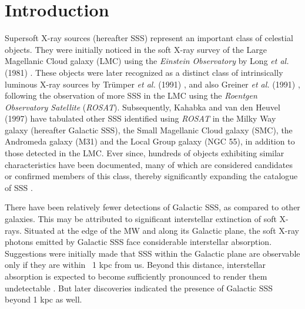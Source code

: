 \section{Introduction}
    
    Supersoft X-ray sources (hereafter SSS) represent an important class of celestial objects. They were initially noticed in the soft X-ray survey  of the Large Magellanic Cloud galaxy (LMC) using the \textit{Einstein Observatory} by Long \textit{et al.} (1981) \cite{long81}. These objects were later recognized as a distinct class of intrinsically luminous X-ray sources by Trümper \textit{et al.} (1991) \cite{trumper1991x}, and also Greiner \textit{et al.} (1991) \cite{greiner1991rosat}, following the observation of more SSS in the LMC using the \textit{Roentgen Observatory Satellite} (\textit{ROSAT}). Subsequently, Kahabka and van den Heuvel (1997) \cite{kahabka97} have tabulated other SSS identified using \textit{ROSAT} in the Milky Way galaxy (hereafter Galactic SSS), the Small Magellanic Cloud galaxy (SMC), the Andromeda galaxy (M31) and the Local Group galaxy (NGC 55), in addition to those detected in the LMC. Ever since, hundreds of objects exhibiting similar characteristics have been documented, many of which are considered candidates or confirmed members of this class, thereby significantly expanding the catalogue of SSS \cite{kahabkatrumper1996, steinerdiaz1998, greiner2000, pietsch2003deep, di2003luminous, orio2010census, henze2010recent, sturm2012new, galiullin2021populations}.
    
    There have been relatively fewer detections of Galactic SSS, as compared to other galaxies. This may be attributed to significant interstellar extinction of soft X-rays. Situated at the edge of the MW and along its Galactic plane, the soft X-ray photons emitted by Galactic SSS face considerable interstellar absorption. Suggestions were initially made that SSS within the Galactic plane are observable only if they are within ~1 kpc from us. %
    Beyond this distance, interstellar absorption is expected to become sufficiently pronounced to render them undetectable \cite{van1992accreting}. But later discoveries indicated the presence of Galactic SSS beyond 1 kpc as well.
    
